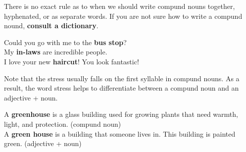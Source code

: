 \documentclass[10pt,a4paper]{article}
\begin{document}
There is no exact rule as to when we should write compund nouns together, hyphenated, or as separate words. If you are not sure how to write a compund nound, \textbf{consult a dictionary}.
\begin{center}
		Could you go with me to the \textbf{bus stop}?\\
		My \textbf{in-laws} are incredible people.\\
		I love your new \textbf{haircut}! You look fantastic!
\end{center}
Note that the stress usually falls on the first syllable in compund nouns. As a result, the word stress helps to differentiate between a compund noun and an adjective + noun.
\begin{center}
		A \textbf{greenhouse} is a glass building used for growing plants that need warmth, light, and protection. (compund noun)\\
		A \textbf{green house} is a building that someone lives in. This building is painted green. (adjective + noun)
\end{center}
\end{document}
